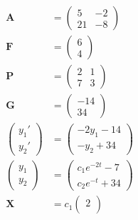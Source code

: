 \documentclass{article}
\begin{document}
\begin{align*}
  \mathbf{A}      & = \begin{pmatrix}
                        5  & -2 \\
                        21 & -8
                      \end{pmatrix}                                                         \\
  \mathbf{F}      & = \begin{pmatrix}
                        6 \\
                        4
                      \end{pmatrix}                                                         \\
  \mathbf{P}      & = \begin{pmatrix}
                        2 & 1 \\
                        7 & 3
                      \end{pmatrix}                                                         \\
  \mathbf{G}      & = \begin{pmatrix}
                        -14 \\
                        34
                      \end{pmatrix}                                                         \\
  \begin{pmatrix}
    y_1' \\
    y_2'
  \end{pmatrix} & = \begin{pmatrix}
                      -2 y_1 - 14 \\
                      -y_2 + 34
                    \end{pmatrix}                                                           \\
  \begin{pmatrix}
    y_1 \\
    y_2
  \end{pmatrix} & = \begin{pmatrix}
                      c_1 e^{-2 t} - 7 \\
                      c_2 e^{-t} + 34
                    \end{pmatrix}                                                         \\
  \mathbf{X}      & = c_1 \begin{pmatrix}
                            2 \\

\end{pmatrix}
\end{align*}
\end{document}
